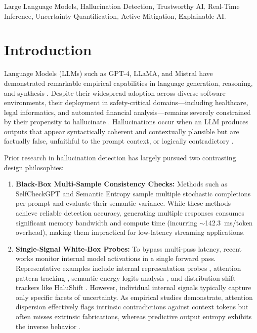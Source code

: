 \documentclass[journal]{IEEEtran}
\begin{document}
\begin{IEEEkeywords}
Large Language Models, Hallucination Detection, Trustworthy AI, Real-Time Inference, Uncertainty Quantification, Active Mitigation, Explainable AI.
\end{IEEEkeywords}

\section{Introduction}
 Language Models (LLMs) such as GPT-4, LLaMA, and Mistral have demonstrated remarkable empirical capabilities in language generation, reasoning, and synthesis \cite{huang2024trustllm, zhang2025siren}. Despite their widespread adoption across diverse software environments, their deployment in safety-critical domains---including healthcare, legal informatics, and automated financial analysis---remains severely constrained by their propensity to hallucinate \cite{ji2023survey}. Hallucinations occur when an LLM produces outputs that appear syntactically coherent and contextually plausible but are factually false, unfaithful to the prompt context, or logically contradictory \cite{min2023factscore}.

Prior research in hallucination detection has largely pursued two contrasting design philosophies:
\begin{enumerate}
    \item \textbf{Black-Box Multi-Sample Consistency Checks:} Methods such as SelfCheckGPT \cite{manakul2023selfcheckgpt} and Semantic Entropy \cite{kossen2024semantic} sample multiple stochastic completions per prompt and evaluate their semantic variance. While these methods achieve reliable detection accuracy, generating multiple responses consumes significant memory bandwidth and compute time (incurring $\sim$142.3~ms/token overhead), making them impractical for low-latency streaming applications.
    \item \textbf{Single-Signal White-Box Probes:} To bypass multi-pass latency, recent works monitor internal model activations in a single forward pass. Representative examples include internal representation probes \cite{su2024mind, zhang2025mhad}, attention pattern tracking \cite{hajji2025map}, semantic energy logits analysis \cite{ma2025semantic}, and distribution shift trackers like HaluShift \cite{dasgupta2025hallushift}. However, individual internal signals typically capture only specific facets of uncertainty. As empirical studies demonstrate, attention dispersion effectively flags intrinsic contradictions against context tokens but often misses extrinsic fabrications, whereas predictive output entropy exhibits the inverse behavior \cite{hajji2025map}.
\end{enumerate}
\end{document}
